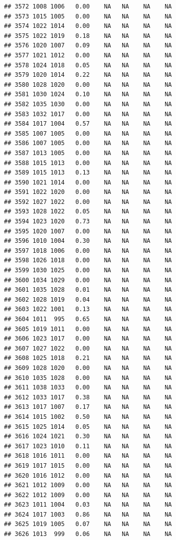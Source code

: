 \documentclass{article}\usepackage{graphicx, color}
\makeatletter
\newenvironment{kframe}{%
 \def\at@end@of@kframe{}%
 \ifinner\ifhmode%
  \def\at@end@of@kframe{\end{minipage}}%
  \begin{minipage}{\columnwidth}%
 \fi\fi%
 \def\FrameCommand##1{\hskip\@totalleftmargin \hskip-\fboxsep
 \colorbox{shadecolor}{##1}\hskip-\fboxsep
     \hskip-\linewidth \hskip-\@totalleftmargin \hskip\columnwidth}%
 \MakeFramed {\advance\hsize-\width
   \@totalleftmargin\z@ \linewidth\hsize
   \@setminipage}}%
 {\par\unskip\endMakeFramed%
 \at@end@of@kframe}
\newenvironment{knitrout}{}{} %
\makeatother
\begin{document}
\begin{knitrout}
\begin{kframe}
\begin{verbatim}
## 3572 1008 1006   0.00    NA   NA    NA    NA
## 3573 1015 1005   0.00    NA   NA    NA    NA
## 3574 1022 1014   0.00    NA   NA    NA    NA
## 3575 1022 1019   0.18    NA   NA    NA    NA
## 3576 1020 1007   0.09    NA   NA    NA    NA
## 3577 1021 1012   0.00    NA   NA    NA    NA
## 3578 1024 1018   0.05    NA   NA    NA    NA
## 3579 1020 1014   0.22    NA   NA    NA    NA
## 3580 1028 1020   0.00    NA   NA    NA    NA
## 3581 1030 1024   0.10    NA   NA    NA    NA
## 3582 1035 1030   0.00    NA   NA    NA    NA
## 3583 1032 1017   0.00    NA   NA    NA    NA
## 3584 1017 1004   0.57    NA   NA    NA    NA
## 3585 1007 1005   0.00    NA   NA    NA    NA
## 3586 1007 1005   0.00    NA   NA    NA    NA
## 3587 1013 1005   0.00    NA   NA    NA    NA
## 3588 1015 1013   0.00    NA   NA    NA    NA
## 3589 1015 1013   0.13    NA   NA    NA    NA
## 3590 1021 1014   0.00    NA   NA    NA    NA
## 3591 1022 1020   0.00    NA   NA    NA    NA
## 3592 1027 1022   0.00    NA   NA    NA    NA
## 3593 1028 1022   0.05    NA   NA    NA    NA
## 3594 1023 1020   0.73    NA   NA    NA    NA
## 3595 1020 1007   0.00    NA   NA    NA    NA
## 3596 1010 1004   0.30    NA   NA    NA    NA
## 3597 1018 1006   0.00    NA   NA    NA    NA
## 3598 1026 1018   0.00    NA   NA    NA    NA
## 3599 1030 1025   0.00    NA   NA    NA    NA
## 3600 1034 1029   0.00    NA   NA    NA    NA
## 3601 1035 1028   0.01    NA   NA    NA    NA
## 3602 1028 1019   0.04    NA   NA    NA    NA
## 3603 1022 1001   0.13    NA   NA    NA    NA
## 3604 1011  995   0.65    NA   NA    NA    NA
## 3605 1019 1011   0.00    NA   NA    NA    NA
## 3606 1023 1017   0.00    NA   NA    NA    NA
## 3607 1027 1022   0.00    NA   NA    NA    NA
## 3608 1025 1018   0.21    NA   NA    NA    NA
## 3609 1028 1020   0.00    NA   NA    NA    NA
## 3610 1035 1028   0.00    NA   NA    NA    NA
## 3611 1038 1033   0.00    NA   NA    NA    NA
## 3612 1033 1017   0.38    NA   NA    NA    NA
## 3613 1017 1007   0.17    NA   NA    NA    NA
## 3614 1015 1002   0.50    NA   NA    NA    NA
## 3615 1025 1014   0.05    NA   NA    NA    NA
## 3616 1024 1021   0.30    NA   NA    NA    NA
## 3617 1023 1010   0.11    NA   NA    NA    NA
## 3618 1016 1011   0.00    NA   NA    NA    NA
## 3619 1017 1015   0.00    NA   NA    NA    NA
## 3620 1016 1012   0.00    NA   NA    NA    NA
## 3621 1012 1009   0.00    NA   NA    NA    NA
## 3622 1012 1009   0.00    NA   NA    NA    NA
## 3623 1011 1004   0.03    NA   NA    NA    NA
## 3624 1017 1003   0.86    NA   NA    NA    NA
## 3625 1019 1005   0.07    NA   NA    NA    NA
## 3626 1013  999   0.06    NA   NA    NA    NA

\end{verbatim}
\end{kframe}
\end{knitrout}
\end{document}
